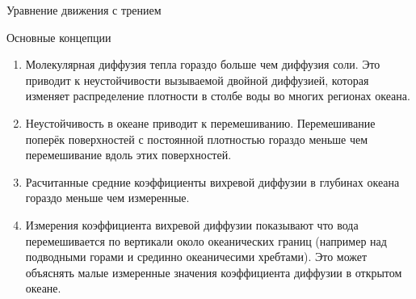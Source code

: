 \begin{chapter}{Уравнение движения с трением}
\begin{section}{Основные концепции}
\begin{enumerate}
\item
Молекулярная диффузия тепла гораздо больше чем диффузия соли. Это
приводит к неустойчивости вызываемой двойной диффузией, которая
изменяет распределение плотности в столбе воды во многих регионах
океана.

\item
Неустойчивость в океане приводит к перемешиванию. Перемешивание
поперёк поверхностей с постоянной плотностью гораздо меньше чем
перемешивание вдоль этих поверхностей.

\item
Расчитанные средние коэффициенты вихревой диффузии в глубинах океана
гораздо меньше чем измеренные.


\item
Измерения коэффициента вихревой диффузии показывают что вода
перемешивается по вертикали около океанических границ (например над
подводными горами и срединно океаничесими хребтами). Это может
объяснять малые измеренные значения коэффициента диффузии в открытом
океане.
%
\end{enumerate} 
\end{section}
\end{chapter}

